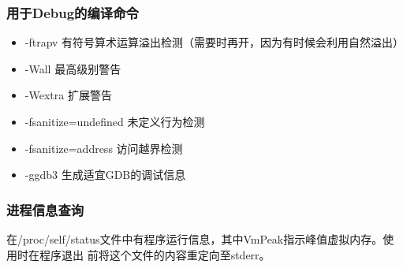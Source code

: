 \subsubsection{用于Debug的编译命令}
\begin{itemize}
	\item -ftrapv 有符号算术运算溢出检测（需要时再开，因为有时候会利用自然溢出）
	\item -Wall 最高级别警告
	\item -Wextra 扩展警告
	\item -fsanitize=undefined 未定义行为检测
	\item -fsanitize=address 访问越界检测
	\item -ggdb3 生成适宜GDB的调试信息
\end{itemize}
\subsubsection{进程信息查询}
在/proc/self/status文件中有程序运行信息，其中VmPeak指示峰值虚拟内存。使用时在程序退出
前将这个文件的内容重定向至stderr。

